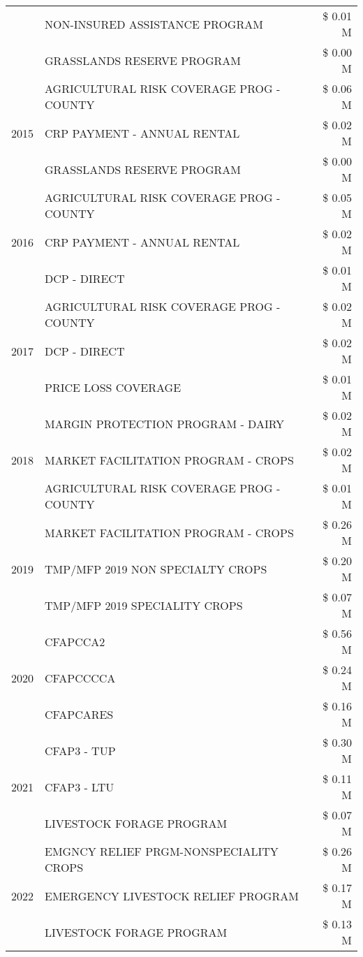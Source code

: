 \begin{tabular}{llr}
 & NON-INSURED ASSISTANCE PROGRAM & \$ 0.01 M \\
 & GRASSLANDS RESERVE PROGRAM & \$ 0.00 M \\
\cline{1-3}
\multirow[t]{3}{*}{2015} & AGRICULTURAL RISK COVERAGE PROG - COUNTY & \$ 0.06 M \\
 & CRP PAYMENT - ANNUAL RENTAL & \$ 0.02 M \\
 & GRASSLANDS RESERVE PROGRAM & \$ 0.00 M \\
\cline{1-3}
\multirow[t]{3}{*}{2016} & AGRICULTURAL RISK COVERAGE PROG - COUNTY & \$ 0.05 M \\
 & CRP PAYMENT - ANNUAL RENTAL & \$ 0.02 M \\
 & DCP - DIRECT & \$ 0.01 M \\
\cline{1-3}
\multirow[t]{3}{*}{2017} & AGRICULTURAL RISK COVERAGE PROG - COUNTY & \$ 0.02 M \\
 & DCP - DIRECT & \$ 0.02 M \\
 & PRICE LOSS COVERAGE & \$ 0.01 M \\
\cline{1-3}
\multirow[t]{3}{*}{2018} & MARGIN PROTECTION PROGRAM - DAIRY & \$ 0.02 M \\
 & MARKET FACILITATION PROGRAM - CROPS & \$ 0.02 M \\
 & AGRICULTURAL RISK COVERAGE PROG - COUNTY & \$ 0.01 M \\
\cline{1-3}
\multirow[t]{3}{*}{2019} & MARKET FACILITATION PROGRAM - CROPS & \$ 0.26 M \\
 & TMP/MFP 2019 NON SPECIALTY CROPS & \$ 0.20 M \\
 & TMP/MFP 2019 SPECIALITY CROPS & \$ 0.07 M \\
\cline{1-3}
\multirow[t]{3}{*}{2020} & CFAPCCA2 & \$ 0.56 M \\
 & CFAPCCCCA & \$ 0.24 M \\
 & CFAPCARES & \$ 0.16 M \\
\cline{1-3}
\multirow[t]{3}{*}{2021} & CFAP3 - TUP & \$ 0.30 M \\
 & CFAP3 - LTU & \$ 0.11 M \\
 & LIVESTOCK FORAGE PROGRAM & \$ 0.07 M \\
\cline{1-3}
\multirow[t]{3}{*}{2022} & EMGNCY RELIEF PRGM-NONSPECIALITY CROPS & \$ 0.26 M \\
 & EMERGENCY LIVESTOCK RELIEF PROGRAM & \$ 0.17 M \\
 & LIVESTOCK FORAGE PROGRAM & \$ 0.13 M \\
\cline{1-3}
\bottomrule
\end{tabular}
